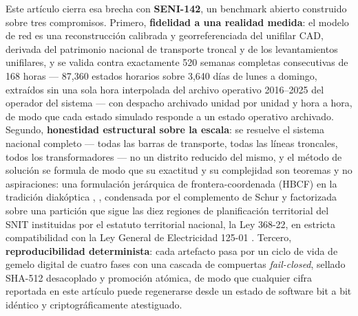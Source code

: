 Este artículo cierra esa brecha con \textbf{SENI-142}, un benchmark abierto construido sobre tres compromisos. Primero, \textbf{fidelidad a una realidad medida}: el modelo de red es una reconstrucción calibrada y georreferenciada del unifilar CAD, derivada del patrimonio nacional de transporte troncal y de los levantamientos unifilares, y se valida contra exactamente 520 semanas completas consecutivas de 168 horas --- 87,360 estados horarios sobre 3,640 días de lunes a domingo, extraídos sin una sola hora interpolada del archivo operativo 2016--2025 del operador del sistema --- con despacho archivado unidad por unidad y hora a hora, de modo que cada estado simulado responde a un estado operativo archivado. Segundo, \textbf{honestidad estructural sobre la escala}: se resuelve el sistema nacional completo --- todas las barras de transporte, todas las líneas troncales, todos los transformadores --- no un distrito reducido del mismo, y el método de solución se formula de modo que su exactitud y su complejidad son teoremas y no aspiraciones: una formulación jerárquica de frontera-coordenada (HBCF) en la tradición diakóptica \cite{kron1963}, \cite{happ1971}, condensada por el complemento de Schur \cite{zhang2005} y factorizada sobre una partición que sigue las diez regiones de planificación territorial del SNIT instituidas por el estatuto territorial nacional, la Ley 368-22, en estricta compatibilidad con la Ley General de Electricidad 125-01 \cite{ley368}. Tercero, \textbf{reproducibilidad determinista}: cada artefacto pasa por un ciclo de vida de gemelo digital de cuatro fases con una cascada de compuertas \emph{fail-closed}, sellado SHA-512 desacoplado y promoción atómica, de modo que cualquier cifra reportada en este artículo puede regenerarse desde un estado de software bit a bit idéntico y criptográficamente atestiguado.

